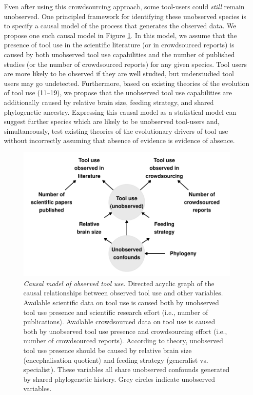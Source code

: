 \documentclass[
  man,floatsintext]{apa6}
\begin{document}
Even after using this crowdsourcing approach, some tool-users could \emph{still}
remain unobserved. One principled framework for identifying these unobserved species
is to specify a causal model of the process that generates the observed data. We
propose one such causal model in Figure \ref{fig:plotDAG}. In this model, we
assume that the presence of tool use in the scientific literature (or in
crowdsourced reports) is caused by both unobserved tool use capabilities and the
number of published studies (or the number of crowdsourced reports) for any
given species. Tool users are more likely to be observed if they are well
studied, but understudied tool users may go undetected. Furthermore, based on
existing theories of the evolution of tool use (11--19), we propose that the
unobserved tool use capabilities are additionally caused by relative brain size,
feeding strategy, and shared phylogenetic ancestry. Expressing this causal model
as a statistical model can suggest further species which are likely to be
unobserved tool-users and, simultaneously, test existing theories of the
evolutionary drivers of tool use without incorrectly assuming that absence of
evidence is evidence of absence.












\begin{figure}
\centering
\includegraphics{manuscript_files/figure-latex/plotDAG-1.pdf}
\caption{\label{fig:plotDAG}\emph{Causal model of observed tool use.} Directed acyclic graph
of the causal relationships between observed tool use and other variables.
Available scientific data on tool use is caused both by unobserved tool use
presence and scientific research effort (i.e., number of publications).
Available crowdsourced data on tool use is caused both by unobserved tool use
presence and crowdsourcing effort (i.e., number of crowdsourced reports).
According to theory, unobserved tool use presence should be caused by relative
brain size (encephalisation quotient) and feeding strategy (generalist vs.~
specialist). These variables all share unobserved confounds generated by shared
phylogenetic history. Grey circles indicate unobserved variables.}
\end{figure}
\end{document}

